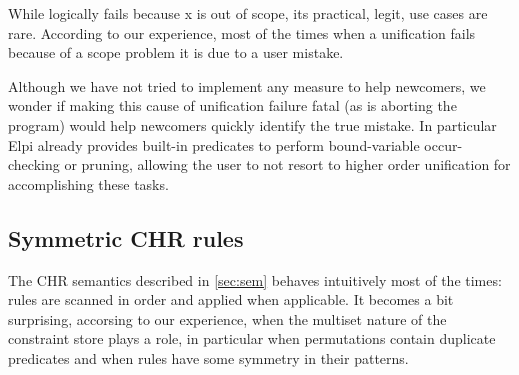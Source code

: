 \documentclass[a4paper, 11pt]{book}
\begin{document}
While  logically fails because x is
out of scope, its practical, legit, use cases are rare.
According to our experience, most of the times when a
unification fails because of
a scope problem it is due to a user mistake.

Although we have not tried to implement any measure to help
newcomers, we wonder if making this cause of unification failure
fatal (as is aborting the program) would help newcomers quickly
identify the true mistake. In particular Elpi already provides
built-in predicates to perform bound-variable occur-checking
or pruning, allowing the user to not resort to higher order
unification for accomplishing these tasks.

\subsection{Symmetric CHR rules}

The CHR semantics described in \cref{sec:sem} behaves intuitively most of
the times: rules
are scanned in order and applied when applicable. It becomes a bit surprising,
accorsing to our experience, when the multiset nature of the constraint store
plays a role, in particular when permutations contain duplicate predicates
and when rules have some symmetry in their patterns.
\end{document}
